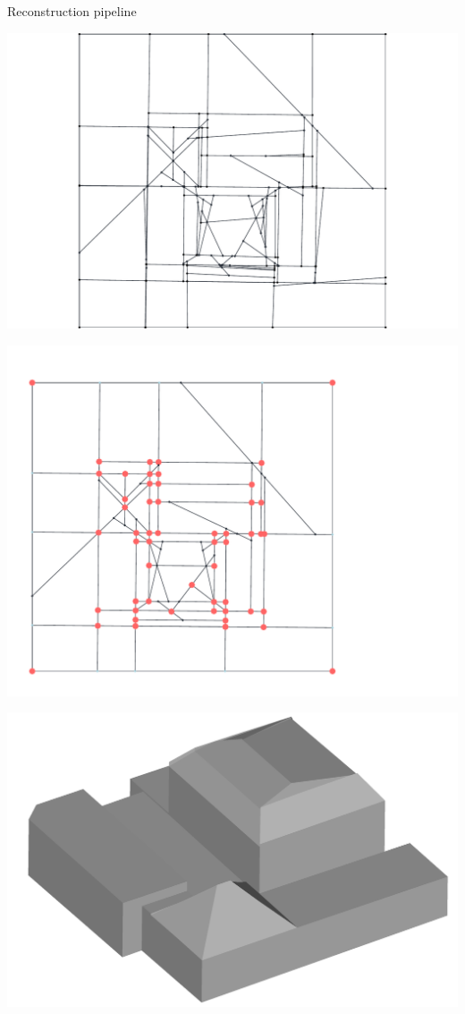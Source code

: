 \begin{frame}{Reconstruction pipeline}
	\begin{minipage}[b]{0.2\linewidth}
		\includegraphics[width=\linewidth]{pipeline/original}
	\end{minipage}%
	\begin{minipage}[b]{0.2\linewidth}
		\includegraphics[width=\linewidth]{pipeline/simplified}
	\end{minipage}%
	\begin{minipage}[b]{0.2\linewidth}
		\includegraphics[width=\linewidth]{pipeline/mesh_crop}
	\end{minipage}


\end{frame}
